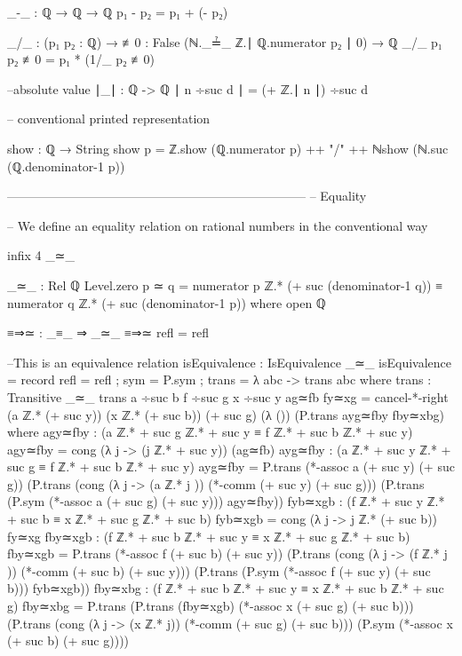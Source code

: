 \documentclass[11pt,a4paper]{article}
\begin{document}
\begin{code}
_-_ : ℚ → ℚ → ℚ
p₁ - p₂ = p₁ + (- p₂)

_/_ : (p₁ p₂ : ℚ) → {≢0 : False (ℕ._≟_ ℤ.∣ ℚ.numerator p₂ ∣ 0)} → ℚ
_/_ p₁ p₂ {≢0} = p₁ * (1/_ p₂ {≢0})


--absolute value
∣_∣ : ℚ -> ℚ
∣ n ÷suc d ∣ = (+ ℤ.∣ n ∣) ÷suc d

-- conventional printed representation

show : ℚ → String
show p = ℤ.show (ℚ.numerator p) ++ "/" ++ ℕshow (ℕ.suc (ℚ.denominator-1 p))

------------------------------------------------------------------------
-- Equality

-- We define an equality relation on rational numbers in the conventional way

infix 4 _≃_

_≃_ : Rel ℚ Level.zero
p ≃ q = numerator p ℤ.* (+ suc (denominator-1 q)) ≡
        numerator q ℤ.* (+ suc (denominator-1 p))
  where open ℚ

≡⇒≃ : _≡_ ⇒ _≃_
≡⇒≃ refl = refl

--This is an equivalence relation
isEquivalence : IsEquivalence _≃_
isEquivalence = record {
  refl = refl ;
  sym = P.sym ;
  trans = λ {a}{b}{c} -> trans {a}{b}{c}
  }
    where
    trans : Transitive _≃_
    trans {a ÷suc b} {f ÷suc g} {x ÷suc y} ag≃fb fy≃xg = 
      cancel-*-right (a ℤ.* (+ suc y)) (x ℤ.* (+ suc b)) (+ suc g) (λ {()}) 
        (P.trans ayg≃fby fby≃xbg)
      where
        agy≃fby : (a ℤ.* + suc g ℤ.* + suc y ≡ f ℤ.* + suc b ℤ.* + suc y)
        agy≃fby = cong (λ j -> (j ℤ.* + suc y)) (ag≃fb)
        ayg≃fby : (a ℤ.* + suc y ℤ.* + suc g ≡ f ℤ.* + suc b ℤ.* + suc y)
        ayg≃fby = P.trans (*-assoc a (+ suc y) (+ suc g)) 
          (P.trans (cong (λ j -> (a ℤ.* j )) (*-comm (+ suc y) (+ suc g))) 
            (P.trans (P.sym (*-assoc a (+ suc g) (+ suc y))) agy≃fby))
        fyb≃xgb : (f ℤ.* + suc y ℤ.* + suc b ≡ x ℤ.* + suc g ℤ.* + suc b)
        fyb≃xgb = cong (λ j -> j ℤ.* (+ suc b)) fy≃xg
        fby≃xgb : (f ℤ.* + suc b ℤ.* + suc y ≡ x ℤ.* + suc g ℤ.* + suc b)
        fby≃xgb = P.trans (*-assoc f (+ suc b) (+ suc y)) 
          (P.trans (cong (λ j -> (f ℤ.* j )) (*-comm (+ suc b) (+ suc y))) 
            (P.trans (P.sym (*-assoc f (+ suc y) (+ suc b))) fyb≃xgb))
        fby≃xbg : (f ℤ.* + suc b ℤ.* + suc y ≡ x ℤ.* + suc b ℤ.* + suc g)
        fby≃xbg = P.trans (P.trans (fby≃xgb) (*-assoc x (+ suc g) (+ suc b))) 
          (P.trans (cong (λ j -> (x ℤ.* j)) (*-comm (+ suc g) (+ suc b))) 
            (P.sym (*-assoc x (+ suc b) (+ suc g))))



\end{code}
\end{document}
